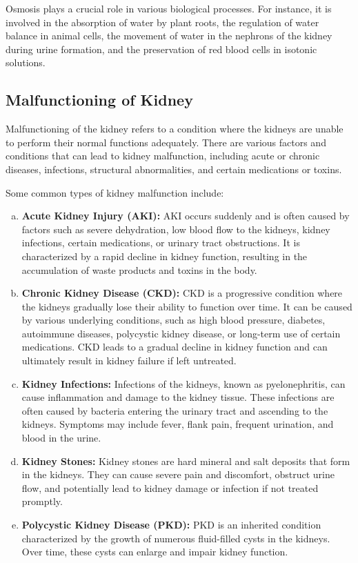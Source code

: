 \documentclass[12pt, a4paper]{article} %
\begin{document}
Osmosis plays a crucial role in various biological processes. For instance, it is involved in the absorption of water by plant roots, the regulation of water balance in animal cells, the movement of water in the nephrons of the kidney during urine formation, and the preservation of red blood cells in isotonic solutions.

\subsection{Malfunctioning of Kidney}
\BgThispage

Malfunctioning of the kidney refers to a condition where the kidneys are unable to perform their normal functions adequately. There are various factors and conditions that can lead to kidney malfunction, including acute or chronic diseases, infections, structural abnormalities, and certain medications or toxins.

Some common types of kidney malfunction include:

\begin{enumerate}[a)]
    \item {\bf Acute Kidney Injury (AKI):} AKI occurs suddenly and is often caused by factors such as severe dehydration, low blood flow to the kidneys, kidney infections, certain medications, or urinary tract obstructions. It is characterized by a rapid decline in kidney function, resulting in the accumulation of waste products and toxins in the body.
    \item {\bf Chronic Kidney Disease (CKD):} CKD is a progressive condition where the kidneys gradually lose their ability to function over time. It can be caused by various underlying conditions, such as high blood pressure, diabetes, autoimmune diseases, polycystic kidney disease, or long-term use of certain medications. CKD leads to a gradual decline in kidney function and can ultimately result in kidney failure if left untreated.
    \item {\bf Kidney Infections:} Infections of the kidneys, known as pyelonephritis, can cause inflammation and damage to the kidney tissue. These infections are often caused by bacteria entering the urinary tract and ascending to the kidneys. Symptoms may include fever, flank pain, frequent urination, and blood in the urine.
    \item {\bf Kidney Stones:} Kidney stones are hard mineral and salt deposits that form in the kidneys. They can cause severe pain and discomfort, obstruct urine flow, and potentially lead to kidney damage or infection if not treated promptly.
    \item {\bf Polycystic Kidney Disease (PKD):} PKD is an inherited condition characterized by the growth of numerous fluid-filled cysts in the kidneys. Over time, these cysts can enlarge and impair kidney function.
\end{enumerate}
\end{document}
